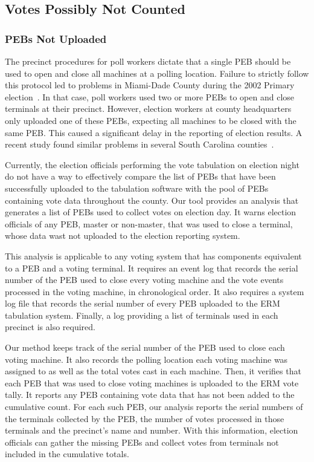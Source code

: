 \subsection{Votes Possibly Not Counted}
\subsubsection{PEBs Not Uploaded}
\label{sec:pebs_not_uploaded}
The precinct procedures for poll workers dictate that a single PEB
should be used to open and close all machines at a polling
location. Failure to strictly follow this protocol led to problems in
Miami-Dade County during the 2002 Primary
election~\cite{Mazella2002}. In that case, poll workers used two or
more PEBs to open and close terminals at their precinct.  However,
election workers at county headquarters only uploaded one of these
PEBs, expecting all machines to be closed with the same PEB. This
caused a significant delay in the reporting of election results. A
recent study found similar problems in several South Carolina
counties~\cite{Buell2011}.

Currently, the election officials performing the vote tabulation on
election night do not have a way to effectively compare the list of
PEBs that have been successfully uploaded to the tabulation software
with the pool of PEBs containing vote data throughout the county. Our
tool provides an analysis that generates a list of PEBs used to collect
votes on election day. It warns election officials of any PEB, master
or non-master, that was used to close a terminal, whose data wast not
uploaded to the election reporting system.  

This analysis is applicable to any voting system that has components
equivalent to a PEB and a voting terminal.  It requires an event log
that records the serial number of the PEB used to close every voting
machine and the vote events processed in the voting machine, in
chronological order. It also requires a system log file that records the
serial number of every PEB uploaded to the ERM tabulation
system. Finally, a log providing a list of terminals used in each
precinct is also required.

Our method keeps track of the serial number of the PEB used to close each voting machine. It also records the polling location each voting machine was assigned to as well as the total votes cast in each machine. Then, it verifies that each PEB that was used to close voting machines is uploaded to the ERM vote tally. It reports any PEB containing vote data that has not been added to the cumulative count.  For each such PEB, our analysis reports the serial numbers of the terminals collected by the PEB, the number of votes processed in those terminals and the precinct's name and number. With this information, election officials can gather the missing PEBs and collect votes from terminals not included in the cumulative totals.


